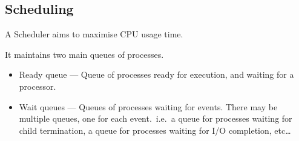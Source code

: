 \subsection{Scheduling}

A Scheduler aims to maximise CPU usage time.

It maintains two main queues of processes.

\begin{itemize}
    \item Ready queue --- Queue of processes ready for execution, and waiting for a processor.
    \item Wait queues --- Queues of processes waiting for events. There may be multiple queues, one for each event.\ i.e.\ a queue for processes waiting for child termination, a queue for processes waiting for I/O completion, etc\ldots
\end{itemize}
